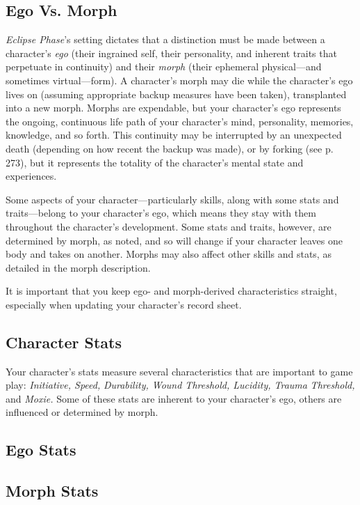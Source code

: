 \subsection{Ego Vs. Morph}

\textit{Eclipse Phase}'s setting dictates that a distinction must 
be made between a character's \textit{ego} (their ingrained 
self, their personality, and inherent traits that perpetuate
in continuity) and their \textit{morph} (their ephemeral
physical—and sometimes virtual—form). A character's
morph may die while the character's ego lives on
(assuming appropriate backup measures have been 
taken), transplanted into a new morph. Morphs are 
expendable, but your character's ego represents the 
ongoing, continuous life path of your character's mind, 
personality, memories, knowledge, and so forth. This 
continuity may be interrupted by an unexpected death 
(depending on how recent the backup was made), or 
by forking (see p. 273), but it represents the totality of 
the character's mental state and experiences.

Some aspects of your character—particularly skills, 
along with some stats and traits—belong to your character's
ego, which means they stay with them throughout
the character's development. Some stats and traits,
however, are determined by morph, as noted, and so 
will change if your character leaves one body and 
takes on another. Morphs may also affect other skills 
and stats, as detailed in the morph description.

It is important that you keep ego- and morph-derived
characteristics straight, especially when updating
your character's record sheet.

\subsection{Character Stats}

Your character's stats measure several characteristics 
that are important to game play: \textit{Initiative, Speed, }
\textit{Durability, Wound Threshold, Lucidity, Trauma }
\textit{Threshold,} and \textit{Moxie.} Some of these stats are inherent
to your character's ego, others are influenced or
determined by morph.

\subsection{Ego Stats}


\subsection{Morph Stats}



